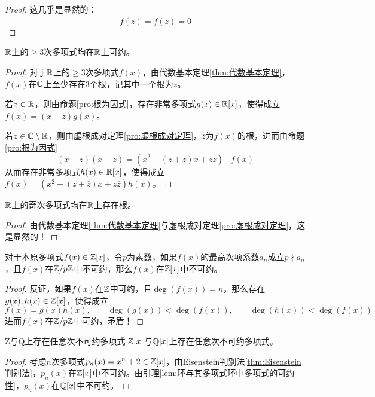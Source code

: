 \begin{proof}
	这几乎是显然的：%
	$$
	f\left(\overline{z}\right)
	=\overline{f(z)}
	=0
	$$
\end{proof}

\begin{proposition}
	$\mathbb{R}$上的$\ge 3$次多项式均在$\mathbb{R}$上可约。
\end{proposition}

\begin{proof}
	对于$\mathbb{R}$上的$\ge 3$次多项式$f(x)$，由代数基本定理\ref{thm:代数基本定理}，$f(x)$在$\mathbb{C}$上至少存在$3$个根，记其中一个根为$z$。
	
	若$z\in\mathbb{R}$，则由命题\ref{pro:根为因式}，存在非常多项式$g(x)\in \mathbb{R}[x]$，使得成立$f(x)=(x-z)g(x)$。
	
	若$z\in\mathbb{C}\setminus\mathbb{R}$，则由虚根成对定理\ref{pro:虚根成对定理}，$\overline{z}$为$f(x)$的根，进而由命题\ref{pro:根为因式}
	$$
	(x-z)(x-\overline{z})=(x^2-(z+\overline{z})x+z\overline{z})\mid f(x)
	$$
	从而存在非常多项式$h(x)\in \mathbb{R}[x]$，使得成立$f(x)=(x^2-(z+\overline{z})x+z\overline{z})h(x)$。
\end{proof}

\begin{proposition}
	$\mathbb{R}$上的奇次多项式均在$\mathbb{R}$上存在根。
\end{proposition}

\begin{proof}
	由代数基本定理\ref{thm:代数基本定理}与虚根成对定理\ref{pro:虚根成对定理}，这是显然的！
\end{proof}

\begin{proposition}
	对于本原多项式$f(x)\in \mathbb{Z}[x]$，令$p$为素数，如果$f(x)$的最高次项系数$a_n$成立$p\nmid a_n$，且$f(x)$在$\mathbb{Z}/p\mathbb{Z}$中不可约，那么$f(x)$在$\mathbb{Z}[x]$中不可约。
\end{proposition}

\begin{proof}
	反证，如果$f(x)$在$\mathbb{Z}$中可约，且$\deg(f(x))=n$，那么存在$g(x),h(x)\in \mathbb{Z}[x]$，使得成立%
	$$
	f(x)=g(x)h(x),\qquad
	\deg(g(x))<\deg(f(x)),\qquad 
	\deg(h(x))<\deg(f(x))
	$$
	进而$f(x)$在$\mathbb{Z}/p\mathbb{Z}$中可约，矛盾！
\end{proof}

\begin{proposition}{}{Z与Q上存在任意次不可约多项式}
	$\mathbb{Z}[x]$与$\mathbb{Q}[x]$上存在任意次不可约多项式。
\end{proposition}

\begin{proof}
	考虑$n$次多项式$p_n(x)=x^n+2\in\mathbb{Z}[x]$，由Eisenstein判别法\ref{thm:Eisenstein判别法}，$p_n(x)$在$\mathbb{Z}[x]$中不可约。由引理\ref{lem:环与其多项式环中多项式的可约性}，$p_n(x)$在$\mathbb{Q}[x]$中不可约。
\end{proof}

